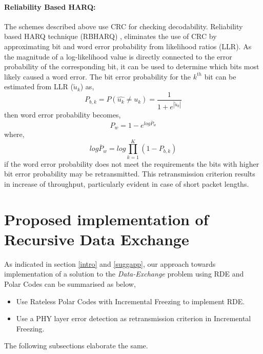 \documentclass[
11pt, %
a4paper, %
oneside, %
headinclude,footinclude, %
BCOR5mm, %
]{scrartcl}
\begin{document}
\paragraph{Reliability Based HARQ:}
The schemes described above use CRC for checking decodability. Reliability based HARQ technique (RBHARQ) \cite{rbharq}, eliminates the use of CRC by approximating bit and word error probability from likelihood ratios (LLR).  As the magnitude of a log-likelihood value is directly
connected to the error probability of the corresponding
bit, it can be used to determine which bits most
likely caused a word error. The bit error probability for the $k^{th}$ bit can be estimated from LLR ($\tilde{u}_k$) as,
\begin{equation}\label{eq:errorllr}
P_{b,k}=P(\hat{u_k} \neq u_k) = \frac{1}{1+e^{|\tilde{u}_k|}}
\end{equation}
then word error probability becomes, 
\begin{equation}
P_w=1-e^{log\bar{P}_w}
\end{equation}
where, $$log\bar{P}_w=log\prod_{k=1}^K (1- P_{b,k})$$ 
if the word error probability does not meet the requirements the bits with higher bit error probability may be retransmitted. This retransmission criterion results in increase of throughput, particularly evident in case of short packet lengths.



\newpage
\section{Proposed implementation of Recursive Data Exchange} \label{propsol}
As indicated in section \ref{intro} and \ref{suggapp}, our approach towards implementation of a solution to the \emph{Data-Exchange} problem using RDE and Polar Codes can be summarised as below, 
\begin{itemize}
\item{Use Rateless Polar Codes with Incremental Freezing to implement RDE.}
\item{Use a PHY layer error detection as retransmission criterion in Incremental Freezing.}
\end{itemize}
The following subsections elaborate the same.
\end{document}

